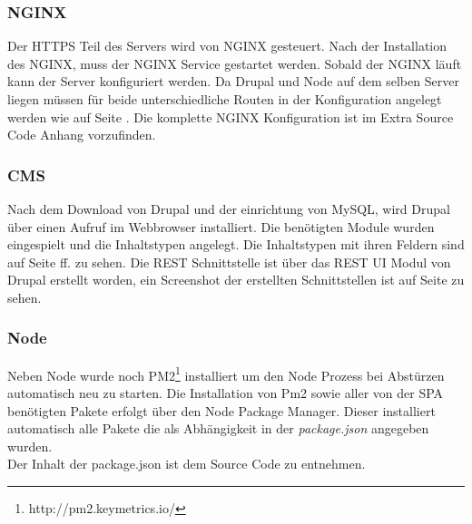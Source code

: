 \documentclass[11pt,a4paper]{article}
\begin{document}
\subsubsection{NGINX}
Der HTTPS Teil des Servers wird von NGINX gesteuert. Nach der Installation des NGINX, muss der NGINX Service gestartet werden. Sobald der NGINX läuft kann der Server konfiguriert werden. Da Drupal und Node auf dem selben Server liegen müssen für beide unterschiedliche Routen in der Konfiguration angelegt werden wie auf Seite \pageref{sec:nginx}. Die komplette NGINX Konfiguration ist im Extra Source Code Anhang vorzufinden.
\subsubsection{CMS}
Nach dem Download von Drupal und der einrichtung von MySQL, wird Drupal über einen Aufruf im Webbrowser installiert. Die benötigten Module wurden eingespielt und die Inhaltstypen angelegt.
Die Inhaltstypen mit ihren Feldern sind auf Seite \pageref{sec:content} ff. zu sehen.
Die REST Schnittstelle ist über das REST \acs{UI} Modul von Drupal erstellt worden, ein Screenshot der erstellten Schnittstellen ist auf Seite \pageref{sec:rest} zu sehen.
\subsubsection{Node}
Neben Node wurde noch PM2\footnote{http://pm2.keymetrics.io/} installiert um den Node Prozess bei Abstürzen automatisch neu zu starten. Die Installation von Pm2 sowie aller von der SPA benötigten Pakete erfolgt über den Node Package Manager. Dieser installiert automatisch alle Pakete die als Abhängigkeit  in der \textit{package.json} angegeben wurden.\\ Der Inhalt der package.json ist dem Source Code zu entnehmen.
\end{document}
